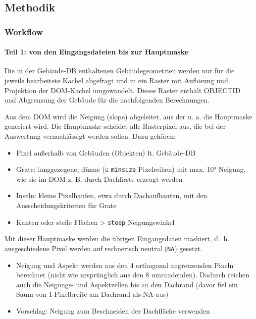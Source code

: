 \documentclass[
]{article}
\providecommand{\tightlist}{%
  \setlength{\itemsep}{0pt}\setlength{\parskip}{0pt}}
\begin{document}
\subsection{Methodik}\label{methodik}

\subsubsection{Workflow}\label{workflow}

\paragraph{Teil 1: von den Eingangsdateien bis zur
Hauptmaske}\label{teil-1-von-den-eingangsdateien-bis-zur-hauptmaske}

Die in der Gebäude-DB enthaltenen Gebäudegeometrien werden nur für die
jeweils bearbeitete Kachel abgefragt und in ein Raster mit Auflösung und
Projektion der DOM-Kachel umgewandelt. Dieses Raster enthält OBJECTID
und Abgrenzung der Gebäude für die nachfolgenden Berechnungen.

Aus dem DOM wird die Neigung (slope) abgeleitet, aus der u. a. die
Hauptmaske generiert wird. Die Hauptmaske scheidet alle Rasterpixel aus,
die bei der Auswertung vernachlässigt werden sollen. Dazu gehören:

\begin{itemize}
\tightlist
\item
  Pixel außerhalb von Gebäuden (Objekten) lt. Gebäude-DB
\item
  Grate: langgezogene, dünne (≤ \texttt{minsize} Pixelreihen) mit max.
  10° Neigung, wie sie im DOM z. B. durch Dachfirste erzeugt werden
\item
  Inseln: kleine Pixelhaufen, etwa durch Dachaufbauten, mit den
  Ausscheidungskriterien für Grate
\item
  Kanten oder steile Flächen \textgreater{} \texttt{steep}
  Neigungswinkel
\end{itemize}

Mit dieser Hauptmaske werden die übrigen Eingangsdaten maskiert, d.~h.
ausgeschiedene Pixel werden auf rechnerisch neutral (\texttt{NA})
gesetzt.

\begin{itemize}
\item
  Neigung und Aspekt werden aus den 4 orthogonal angrenzenden Pixeln
  berechnet (nicht wie ursprünglich aus den 8 umrandenden). Dadurch
  reichen auch die Neigungs- und Aspektzellen bis an den Dachrand (davor
  fiel ein Saum von 1 Pixelbreite am Dachrand als NA aus)
\item
  Vorschlag: Neigung zum Beschneiden der Dachfläche verwenden
\end{itemize}
\end{document}
